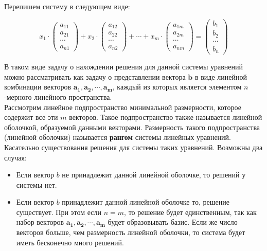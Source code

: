 \documentclass{article}
\begin{document}
Перепишем систему в следующем виде:

\[
	x_1 \cdot \begin{pmatrix} a_{11} \\ a_{21} \\ \cdots \\ a_{n1} \end{pmatrix} + 
	x_2 \cdot \begin{pmatrix} a_{12} \\ a_{22} \\ \cdots \\ a_{n2} \end{pmatrix} +
	\cdots +
	x_m \cdot \begin{pmatrix} a_{1m} \\ a_{2m} \\ \cdots \\ a_{nm} \end{pmatrix} =
	\begin{pmatrix} b_1 \\ b_2 \\ \cdots\\  b_n \end{pmatrix} 
\]

В таком виде задачу о нахождении решения для данной системы уравнений можно рассматривать как задачу о представлении вектора $\mathbf{b}$ в виде линейной комбинации векторов $\mathbf{a_1}, \mathbf{a_2}, \cdots, \mathbf{a_m}$, каждый из которых является элементом $n$-мерного линейного пространства. \\

Рассмотрим линейное подпространство минимальной размерности, которое содержит все эти $m$ векторов. Такое подпространство также называется линейной оболочкой, образуемой данными векторами. Размерность такого подпространства (линейной оболочки) называется \textbf{рангом} системы линейных уравнений. \\

Касательно существования решения для системы таких уравнений. Возможны два случая: 

\begin{itemize}
	\item Если вектор $b$ не принадлежит данной линейной оболочке, то решений у системы нет.
	\item Если вектор $b$ принадлежит данной линейной оболочке то, решение существует. При этом если $n = m$, то решение будет единственным, так как набор векторов $\mathbf{a_1}, \mathbf{a_2}, \cdots, \mathbf{a_m}$ будет образовывать базис. Если же число векторов больше, чем размерность линейной оболочки, то система будет иметь бесконечно много решений.
\end{itemize}
\end{document}
